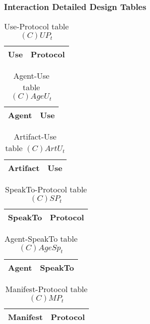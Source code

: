 \subsubsection{Interaction Detailed Design Tables}

\begin{table}[H]
	\centering
	\begin{tabular}{|p{4cm}|p{8cm}|}
			\hline
			\textbf{Use} & \textbf{Protocol} \\
			\hline
			\hline
		\end{tabular}
	\caption{Use-Protocol table $(C)UP_t$}
	\label{tab:cupt}
\end{table}

\begin{table}[H]
	\centering
	\begin{tabular}{|p{4cm}|p{8cm}|}
			\hline
			\textbf{Agent} & \textbf{Use} \\
			\hline
			\hline
		\end{tabular}
	\caption{Agent-Use table $(C)AgeU_t$}
	\label{tab:cageut}
\end{table}

\begin{table}[H]
	\centering
	\begin{tabular}{|p{4cm}|p{8cm}|}
			\hline
			\textbf{Artifact} & \textbf{Use} \\
			\hline
			\hline
		\end{tabular}
	\caption{Artifact-Use table $(C)ArtU_t$}
	\label{tab:cartut}
\end{table}

\begin{table}[H]
	\centering
	\begin{tabular}{|p{4cm}|p{8cm}|}
			\hline
			\textbf{SpeakTo} & \textbf{Protocol} \\
			\hline
			\hline
		\end{tabular}
	\caption{SpeakTo-Protocol table $(C)SP_t$}
	\label{tab:cspt}
\end{table}

\begin{table}[H]
	\centering
	\begin{tabular}{|p{4cm}|p{8cm}|}
			\hline
			\textbf{Agent} & \textbf{SpeakTo} \\
			\hline
			\hline
		\end{tabular}
	\caption{Agent-SpeakTo table $(C)AgeSp_t$}
	\label{tab:cagespt}
\end{table}

\begin{table}[H]
	\centering
	\begin{tabular}{|p{4cm}|p{8cm}|}
			\hline
			\textbf{Manifest} & \textbf{Protocol} \\
			\hline
			\hline
		\end{tabular}
	\caption{Manifest-Protocol table $(C)MP_t$}
	\label{tab:cmpt}
\end{table}

